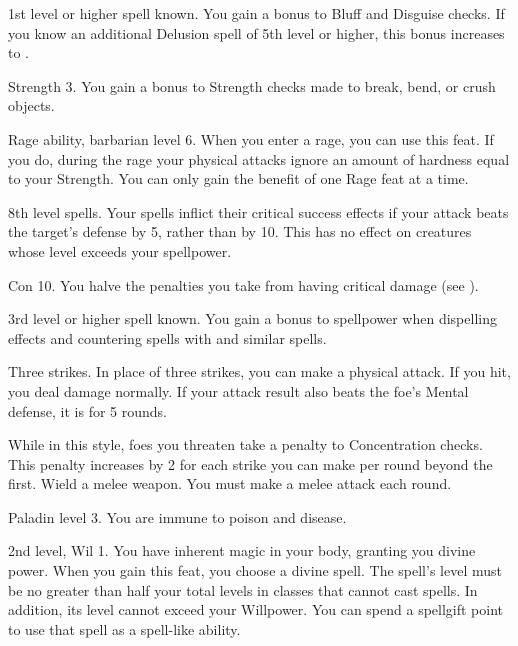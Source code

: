 \featpre 1st level or higher  spell known.
\featben You gain a  bonus to Bluff and Disguise checks.
If you know an additional Delusion spell of 5th level or higher, this bonus increases to .

\featpre Strength 3.
\featben You gain a  bonus to Strength checks made to break, bend, or crush objects.

\featpre Rage ability, barbarian level 6.
\featben When you enter a rage, you can use this feat. If you do, during the rage your physical attacks ignore an amount of hardness equal to your Strength.
 You can only gain the benefit of one Rage feat at a time.

\featpre 8th level spells.
\featben Your spells inflict their critical success effects if your attack beats the target's defense by 5, rather than by 10.
This has no effect on creatures whose level exceeds your spellpower.

\featpre Con 10.
\featben You halve the penalties you take from having critical damage (see ).

\featpre 3rd level or higher  spell known.
\featben You gain a  bonus to spellpower when dispelling effects and countering spells with  and similar spells.

\featpre Three strikes.
\featben In place of three strikes, you can make a physical attack.
If you hit, you deal damage normally.
If your attack result also beats the foe's Mental defense, it is \disoriented for 5 rounds.

\featben While in this style, foes you threaten take a  penalty to Concentration checks.
This penalty increases by 2 for each strike you can make per round beyond the first.
\stylereq Wield a melee weapon. You must make a melee attack each round.

\featpre Paladin level 3.
\featben You are immune to poison and disease.

\featpres 2nd level, Wil 1.
\featben You have inherent magic in your body, granting you divine power.
When you gain this feat, you choose a divine spell.
The spell's level must be no greater than half your total levels in classes that cannot cast spells.
In addition, its level cannot exceed your Willpower.
You can spend a spellgift point to use that spell as a spell-like ability.

